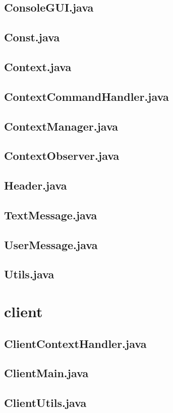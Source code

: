 \documentclass[a4paper, 12pt]{report}
\begin{document}
    \section{ConsoleGUI.java}
    \section{Const.java}
    \section{Context.java}
    \section{ContextCommandHandler.java}
    \section{ContextManager.java}
    \section{ContextObserver.java}
    \section{Header.java}
    \section{TextMessage.java}
    \section{UserMessage.java}
    \section{Utils.java}

    \chapter{client}
    \section{ClientContextHandler.java}
    \section{ClientMain.java}
    \section{ClientUtils.java}
\end{document}
